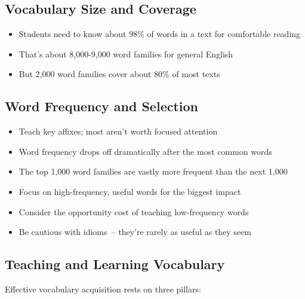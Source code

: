 \subsection*{Vocabulary Size and Coverage}

\begin{itemize}
\item Students need to know about 98\% of words in a text for comfortable reading
\item That's about 8,000-9,000 word families for general English
\item But 2,000 word families cover about 80\% of most texts
\end{itemize}

\subsection*{Word Frequency and Selection}

\begin{itemize}

\item Teach key affixes; most aren't worth focused attention
\item Word frequency drops off dramatically after the most common words
\item The top 1,000 word families are vastly more frequent than the next 1,000
\item Focus on high-frequency, useful words for the biggest impact
\item Consider the opportunity cost of teaching low-frequency words
\item Be cautious with idioms~-- they're rarely as useful as they seem
\end{itemize}

\subsection*{Teaching and Learning Vocabulary}

Effective vocabulary acquisition rests on three pillars:

